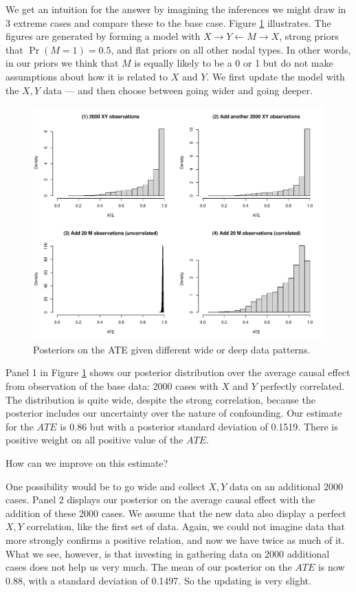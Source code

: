 \documentclass[
  12pt,
]{book}
\begin{document}
We get an intuition for the answer by imagining the inferences we might draw in 3 extreme cases and compare these to the base case. Figure \ref{fig:widedeepXYMX} illustrates. The figures are generated by forming a model with \(X\rightarrow Y \leftarrow M \rightarrow X\), strong priors that \(\Pr(M=1)=0.5\), and flat priors on all other nodal types. In other words, in our priors we think that \(M\) is equally likely to be a 0 or 1 but do not make assumptions about how it is related to \(X\) and \(Y\). We first update the model with the \(X,Y\) data --- and then choose between going wider and going deeper.

\begin{figure}
\centering
\includegraphics{ii_files/figure-latex/widedeepXYMX-1.pdf}
\caption{\label{fig:widedeepXYMX}Posteriors on the ATE given different wide or deep data patterns.}
\end{figure}

Panel 1 in Figure \ref{fig:widedeepXYMX} shows our posterior distribution over the average causal effect from observation of the base data: 2000 cases with \(X\) and \(Y\) perfectly correlated. The distribution is quite wide, despite the strong correlation, because the posterior includes our uncertainty over the nature of confounding. Our estimate for the \(ATE\) is 0.86 but with a posterior standard deviation of 0.1519. There is positive weight on all positive value of the \(ATE\).

How can we improve on this estimate?

One possibility would be to go wide and collect \(X,Y\) data on an additional 2000 cases. Panel 2 displays our posterior on the average causal effect with the addition of these 2000 cases. We assume that the new data also display a perfect \(X,Y\) correlation, like the first set of data. Again, we could not imagine data that more strongly confirms a positive relation, and now we have twice as much of it. What we see, however, is that investing in gathering data on 2000 additional cases does not help us very much. The mean of our posterior on the \(ATE\) is now 0.88, with a standard deviation of 0.1497. So the updating is very slight.
\end{document}
